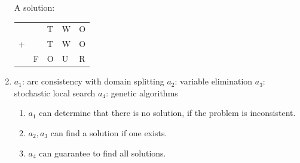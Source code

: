\documentclass{article}
\begin{document}
\begin{enumerate}
A solution: 
\begin{table}[h]
\centering
\begin{tabular}{lllll}
  &   & T & W & O \\
+ &   & T & W & O \\ \hline
  & F & O & U & R
\end{tabular}
\end{table}



\item
$a_1$: arc consistency with domain splitting
$a_2$: variable elimination
$a_3$: stochastic local search
$a_4$: genetic algorithms

\begin{enumerate}
\item $a_1$ can determine that there is no solution, if the problem is inconsistent.
\item $a_2,a_3$ can find a solution if one exists.
\item $a_4$ can guarantee to find all solutions.
\end{enumerate}



\end{enumerate}
\end{document}
